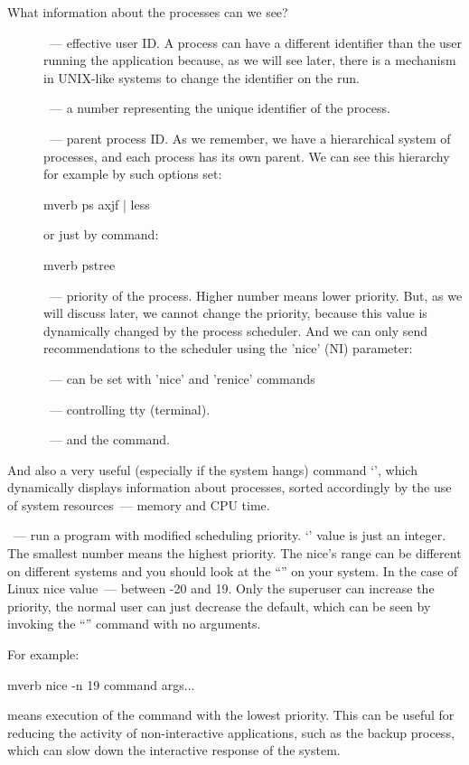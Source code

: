 What information about the processes can we see?
\begin{description}
\item[]~--- effective user ID. A process can have a different
identifier than the user running the application because, as we will see
later, there is a mechanism in UNIX-like systems to change the identifier
on the run.
\item[]~--- a number representing the unique identifier of the process.
\item[]~--- parent process ID. As we remember, we have
a hierarchical system of processes, and each process has its own parent.
We can see this hierarchy for example by such options set:
\begin{code}{mverb}
ps axjf | less
\end{code}
or just by command:
\begin{code}{mverb}
pstree
\end{code}
\item[]~--- priority of the process. Higher number means lower
priority. But, as we will discuss later, we cannot change the priority,
because this value is dynamically changed by the process scheduler. And
we can only send recommendations to the scheduler using the 'nice' (NI)
parameter:
\item[]~--- can be set with 'nice' and 'renice' commands
\item[]~--- controlling tty (terminal).
\item[]~--- and the command.
\end{description}

And also a very useful (especially if the system hangs) command `',
which dynamically displays information about processes, sorted
accordingly by the use of system resources~--- memory and CPU time.

{\bf{}}~--- run a program with modified scheduling priority.
`' value is just an integer. The smallest number means
the highest priority. The nice's range can be different on different systems
and you should look at the ``'' on your system. In the case of
Linux nice value~--- between -20 and 19. Only the superuser can increase
the priority, the normal user can just decrease the default, which can be seen
by invoking the ``'' command with no arguments.

For example:
\begin{code}{mverb}
nice -n 19 command args...
\end{code}
means execution of the command with the lowest priority. This can be useful
for reducing the activity of non-interactive applications, such as the backup
process, which can slow down the interactive response of the system.

